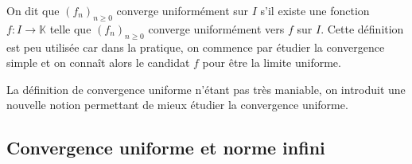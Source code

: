 \documentclass[french,11pt,twoside]{VcCours}
\begin{document}
\begin{Remarque}{} On dit que $(f_n)_{n \geq 0}$ converge uniformément sur $I$ s'il existe une fonction $f : I \rightarrow \mathbb{K}$ telle que $(f_n)_{n \geq 0}$ converge uniformément vers $f$ sur $I$. Cette définition est peu utilisée car dans la pratique, on commence par étudier la convergence simple et on connaît alors le candidat $f$ pour être la limite uniforme.
\end{Remarque}

\medskip

La définition de convergence uniforme n'étant pas très maniable, on introduit une nouvelle notion permettant de mieux étudier la convergence uniforme.

\subsection{Convergence uniforme et norme infini}
%
%
%
\end{document}
